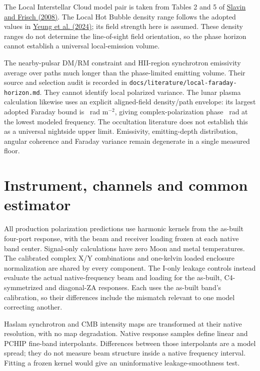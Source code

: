 \documentclass[10pt,letterpaper]{article}
\begin{document}


The Local Interstellar Cloud model pair is taken from Tables 2 and 5 of
\href{https://astro.uchicago.edu/~frisch/2008SlavinFrisch.pdf}{Slavin and
Frisch (2008)}. The Local Hot Bubble density range follows the adopted values
in \href{https://arxiv.org/html/2410.23345v1}{Yeung et al. (2024)};
its field strength here is assumed. These density ranges do not determine
the line-of-sight field orientation, so the phase horizon cannot establish
a universal local-emission volume.

The nearby-pulsar DM/RM constraint and HII-region synchrotron emissivity
average over paths much longer than the phase-limited emitting volume.
Their source and selection audit is recorded in
\nolinkurl{docs/literature/local-faraday-horizon.md}. They cannot identify
local polarized variance. The lunar plasma calculation likewise uses an
explicit aligned-field density/path envelope: its largest adopted Faraday
bound is \LunarFaradayBound\ rad m$^{-2}$, giving complex-polarization
phase \LunarPhaseBound\ rad at the lowest modeled frequency. The
occultation literature does not establish this as a universal nightside
upper limit. Emissivity, emitting-depth distribution, angular coherence and
Faraday variance remain degenerate in a single measured floor.

\section{Instrument, channels and common estimator}

All production polarization predictions use harmonic kernels from the
as-built four-port response, with the beam and receiver loading frozen at
each native band center. Signal-only calculations have zero Moon and metal
temperatures. The calibrated complex X/Y combinations and one-kelvin loaded
enclosure normalization are shared by every component.
The I-only leakage controls instead evaluate the actual native-frequency
beam and loading for the as-built, C4-symmetrized and diagonal-ZA responses.
Each uses the as-built band's calibration, so their differences include
the mismatch relevant to one model correcting another.

Haslam synchrotron and CMB intensity maps are transformed at their native
resolution, with no map degradation. Native response samples define linear
and PCHIP fine-band interpolants. Differences between those interpolants
are a model spread; they do not measure beam structure inside a native
frequency interval. Fitting a frozen kernel would give an uninformative
leakage-smoothness test.
\end{document}
